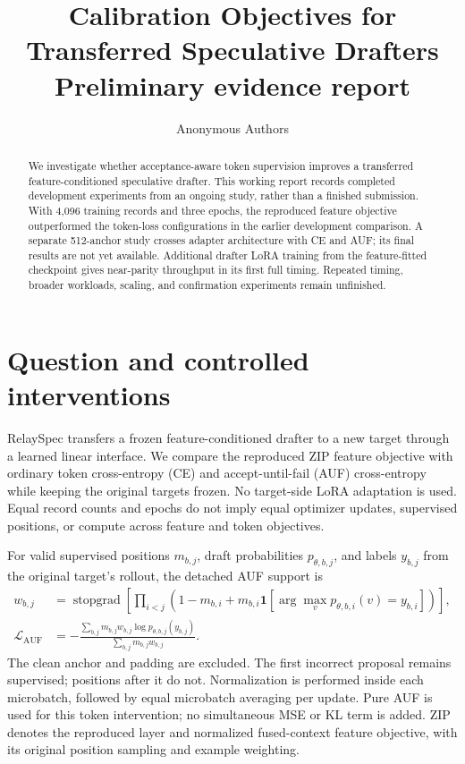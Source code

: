 \documentclass{article}
\title{Calibration Objectives for\\Transferred Speculative Drafters\\\large Preliminary evidence report}
\author{Anonymous Authors}
\begin{document}
\maketitle
{}
\begin{abstract}
We investigate whether acceptance-aware token supervision improves a
transferred feature-conditioned speculative drafter. This working report
records completed development experiments from an ongoing study, rather
than a finished submission. With 4,096 training records and three epochs,
the reproduced feature objective outperformed the token-loss configurations
in the earlier development comparison. A separate 512-anchor study crosses
adapter architecture with CE and AUF; its final results are not yet available.
Additional drafter LoRA training from the feature-fitted checkpoint gives
near-parity throughput in its first full timing. Repeated timing, broader
workloads, scaling, and confirmation experiments remain unfinished.
\end{abstract}

\section{Question and controlled interventions}
RelaySpec transfers a frozen feature-conditioned drafter to a new target
through a learned linear interface. We compare the reproduced ZIP feature
objective with ordinary token cross-entropy (CE) and accept-until-fail
(AUF) cross-entropy while keeping the original targets frozen. No
target-side LoRA adaptation is used. Equal record counts and epochs do
not imply equal optimizer updates, supervised positions, or compute
across feature and token objectives.

For valid supervised positions $m_{b,j}$, draft probabilities
$p_{\theta,b,j}$, and labels $y_{b,j}$ from the original target's rollout,
the detached AUF support is
\begin{align}
 w_{b,j}&=\operatorname{stopgrad}\left[
 \prod_{i<j}\left(1-m_{b,i}+m_{b,i}
 \mathbf{1}[\arg\max_v p_{\theta,b,i}(v)=y_{b,i}]\right)\right],\\
 \mathcal L_{\mathrm{AUF}}&=-\frac{\sum_{b,j}m_{b,j}w_{b,j}
 \log p_{\theta,b,j}(y_{b,j})}{\sum_{b,j}m_{b,j}w_{b,j}}.
\end{align}
The clean anchor and padding are excluded. The first incorrect proposal
remains supervised; positions after it do not. Normalization is performed
inside each microbatch, followed by equal microbatch averaging per update.
Pure AUF is used for this token intervention; no simultaneous MSE or KL
term is added. ZIP denotes the reproduced layer and normalized fused-context
feature objective, with its original position sampling and example weighting.
\end{document}
